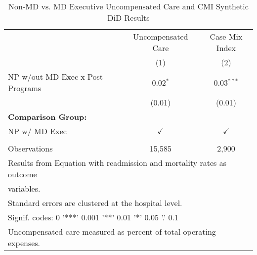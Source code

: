 \begin{table}[ht!]

\caption{\label{tab:MD_noMD_uncompCMI_synth}Non-MD vs. MD Executive Uncompensated Care and CMI Synthetic DiD Results}
\centering
\begin{tabular}[t]{lcc}
\toprule
\multicolumn{1}{c}{ } & \multicolumn{1}{c}{Uncompensated Care} & \multicolumn{1}{c}{Case Mix Index} \\
 & (1) & (2)\\
\midrule
NP w/out MD Exec x Post Programs & 0.02$^{*}$ & 0.03$^{***}$\\
 & (0.01) & (0.01)\\
\textbf{Comparison Group:} &  & \\
NP w/ MD Exec & $\checkmark$ & $\checkmark$\\
 &  & \\
\addlinespace
Observations & 15,585 & 2,900\\
\bottomrule
\multicolumn{3}{l}{\textsuperscript{} Results from Equation with readmission and mortality rates as outcome}\\
\multicolumn{3}{l}{variables.}\\
\multicolumn{3}{l}{\textsuperscript{} Standard errors are clustered at the hospital level.}\\
\multicolumn{3}{l}{\textsuperscript{} Signif. codes: 0 '***' 0.001 '**' 0.01 '*' 0.05 '.' 0.1}\\
\multicolumn{3}{l}{\textsuperscript{} Uncompensated care measured as percent of total operating expenses.}\\
\end{tabular}
\end{table}
